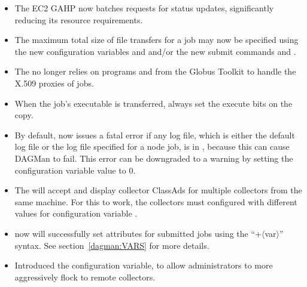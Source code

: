 \begin{itemize}

\item The EC2 GAHP now batches requests for status updates, significantly
reducing its resource requirements.

\item The maximum total size of file transfers for a job may now be
specified using the new configuration variables
 and  
and/or the new submit commands 
 and
.

\item The  no longer relies on programs
 and  from the Globus
Toolkit to handle the X.509 proxies of jobs.

\item When the job's executable is transferred, always set the execute
bits on the copy.

\item By default,  now issues a fatal error
if any log file, which is either
the default log file or the log file specified for a node job,
is in , because this can cause DAGMan to fail.
This error can be downgraded to a warning by setting the
configuration variable
 value to 0.

\item The  will accept and display collector ClassAds for
multiple collectors from the same machine. For this to work, the
collectors must configured with different values for configuration
variable .

\item {} now will successfully set attributes for submitted jobs
using the  ``+$\langle$var$\rangle$'' syntax.
See section~\ref{dagman:VARS} for more details.

\item Introduced the  configuration variable, to allow
administrators to more aggressively flock to remote collectors.

\end{itemize}

